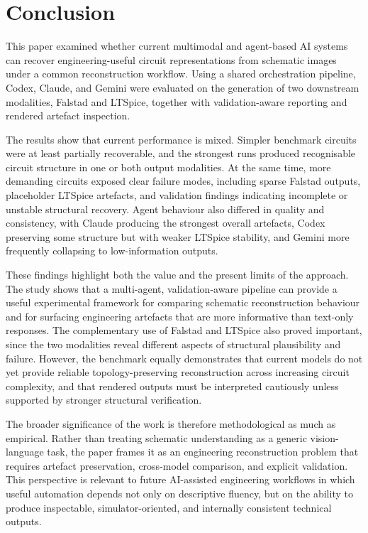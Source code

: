 \section{Conclusion}

This paper examined whether current multimodal and agent-based AI systems can recover engineering-useful circuit representations from schematic images under a common reconstruction workflow. Using a shared orchestration pipeline, Codex, Claude, and Gemini were evaluated on the generation of two downstream modalities, Falstad and LTSpice, together with validation-aware reporting and rendered artefact inspection.

The results show that current performance is mixed. Simpler benchmark circuits were at least partially recoverable, and the strongest runs produced recognisable circuit structure in one or both output modalities. At the same time, more demanding circuits exposed clear failure modes, including sparse Falstad outputs, placeholder LTSpice artefacts, and validation findings indicating incomplete or unstable structural recovery. Agent behaviour also differed in quality and consistency, with Claude producing the strongest overall artefacts, Codex preserving some structure but with weaker LTSpice stability, and Gemini more frequently collapsing to low-information outputs.

These findings highlight both the value and the present limits of the approach. The study shows that a multi-agent, validation-aware pipeline can provide a useful experimental framework for comparing schematic reconstruction behaviour and for surfacing engineering artefacts that are more informative than text-only responses. The complementary use of Falstad and LTSpice also proved important, since the two modalities reveal different aspects of structural plausibility and failure. However, the benchmark equally demonstrates that current models do not yet provide reliable topology-preserving reconstruction across increasing circuit complexity, and that rendered outputs must be interpreted cautiously unless supported by stronger structural verification.

The broader significance of the work is therefore methodological as much as empirical. Rather than treating schematic understanding as a generic vision-language task, the paper frames it as an engineering reconstruction problem that requires artefact preservation, cross-model comparison, and explicit validation. This perspective is relevant to future AI-assisted engineering workflows in which useful automation depends not only on descriptive fluency, but on the ability to produce inspectable, simulator-oriented, and internally consistent technical outputs.

